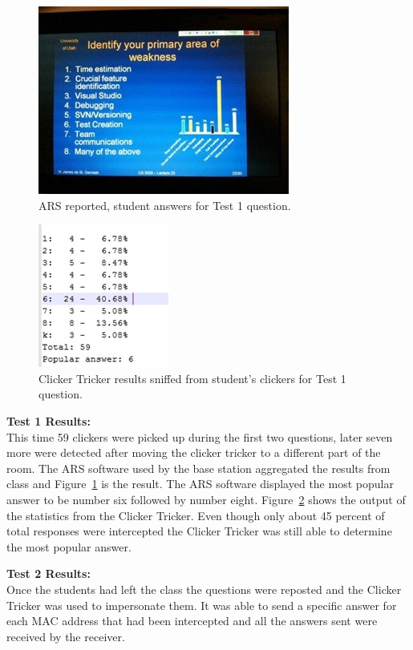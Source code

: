 \begin{figure}[h!]
\centering
  \includegraphics[scale=.95]{images/ARSStatistics}
    \caption{ARS reported, student answers for Test 1 question.}
	\label{img:ARSStatistics}
\end{figure}

\begin{figure}[h!]
\centering
  \includegraphics[scale=1]{images/TrickerStatistics}
    \caption{Clicker Tricker results sniffed from student's clickers for Test 1 question.}
	\label{img:TrickerStatistics}
\end{figure}

\textbf{Test 1 Results:}\\
This time 59 clickers were picked up during the first two questions, later seven more were detected after moving the clicker tricker to a different part of the room.  The ARS software used by the base station aggregated the results from class and Figure~\ref{img:ARSStatistics} is the result.  The ARS software displayed the most popular answer to be number six followed by number eight. Figure~\ref{img:TrickerStatistics} shows the output of the statistics from the Clicker Tricker.  Even though only about 45 percent of total responses were intercepted the Clicker Tricker was still able to determine the most popular answer.

\textbf{Test 2 Results:}\\
Once the students had left the class the questions were reposted and the Clicker Tricker was used to impersonate them. It was able to send a specific answer for each MAC address that had been intercepted and all the answers sent were received by the receiver.

